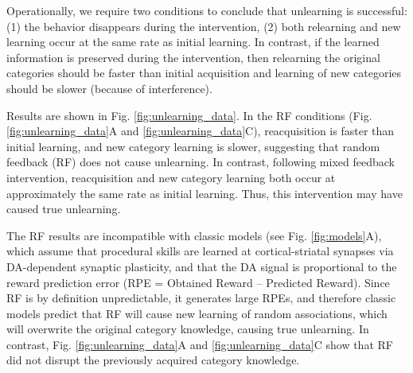 \documentclass[man,apacite,draftfirst]{apa6}
\begin{document}
Operationally, we require two conditions to conclude that unlearning is
successful: (1) the behavior disappears during the intervention, (2) both
relearning and new learning occur at the same rate as initial learning. In
contrast, if the learned information is preserved during the intervention, then
relearning the original categories should be faster than initial acquisition and
learning of new categories should be slower (because of interference).

Results are shown in Fig. \ref{fig:unlearning_data}. In the RF conditions (Fig.
\ref{fig:unlearning_data}A and \ref{fig:unlearning_data}C), reacquisition is
faster than initial learning, and new category learning is slower, suggesting
that random feedback (RF) does not cause unlearning. In contrast, following
mixed feedback intervention, reacquisition and new category learning both occur
at approximately the same rate as initial learning. Thus, this intervention may
have caused true unlearning.

The RF results are incompatible with classic models (see Fig.
\ref{fig:models}A), which assume that procedural skills are learned at
cortical-striatal synapses via DA-dependent synaptic plasticity, and that the DA
signal is proportional to the reward prediction error (RPE = Obtained Reward --
Predicted Reward). Since RF is by definition unpredictable, it generates large
RPEs, and therefore classic models predict that RF will cause new learning of
random associations, which will overwrite the original category knowledge,
causing true unlearning. In contrast, Fig. \ref{fig:unlearning_data}A and
\ref{fig:unlearning_data}C show that RF did not disrupt the previously acquired
category knowledge.
\end{document}
